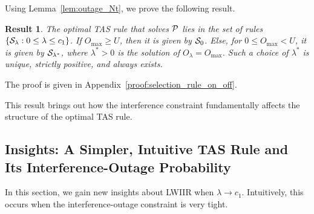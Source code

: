 \documentclass[12pt,draftcls,peerreview,onecolumn]{IEEEtran}
\newtheorem{result}{{\bf Result}}
\newcommand{\brac}[1]{\left({#1}\right)}
\newcommand{\set}[1]{\{#1\}}
\newcommand{\tendsto}{\to}
\newcommand{\ie}{{i.e.}}
\newcommand{\prob}[1]{\text{Pr}\brac{#1}}
\newcommand{\lam}{\lambda}
\newcommand{\lamstar}{\lam^{*}}
\newcommand{\Nt}{{N_t}}
\newcommand{\Pt}{{P_t}}
\newcommand{\puch}{g}
\newcommand{\gk}[1]{{\puch_{#1}}}
\newcommand{\g}{\mathbf{\puch}}
\newcommand{\outmax}{O_{\text{max}}}
\newcommand{\itau}{\tau}
\newcommand{\cone}{c_{1}}
\newcommand{\out}{O}
\newcommand{\taubypt}{\frac{\itau}{\Pt}}
\newcommand{\gkgrtaubypt}[1]{{\gk{#1}}>\taubypt}
\newcommand{\un}{U}
\newcommand{\optproblem}{{\cal P}}
\newcommand{\caluncons}{{\cal S_{\text{0}}}}
\newcommand{\callamrule}{{\cal S_{{\lam}}}}
\newcommand{\outlam}{\out_{\lam}}
\newcommand{\callamstarrule}{\cal S_{\lam^{*}}}
\begin{document}
Using Lemma~\ref{lem:outage_Nt}, we prove the following result. 
%
\begin{result}
\label{res:selection_rule_on_off}
The optimal TAS rule that solves $\optproblem$ lies in the set of rules $\set{\callamrule:0\leq\lam\leq\cone}$. If $\outmax\geq\un$, then it is given by $\caluncons$. Else, for $0\leq\outmax<\un$, it is given by $\callamstarrule$, where $\lamstar>0$  is the solution of $\outlam=\outmax$. Such a choice of $\lamstar$ is unique, strictly positive, and always exists. 
\end{result}
%                
\begin{IEEEproof}
   The proof is given in Appendix~\ref{proof:selection_rule_on_off}.
\end{IEEEproof}
%

This result brings out how the interference constraint fundamentally affects the structure of the optimal TAS rule.


\subsection{Insights: A Simpler, Intuitive  TAS Rule and Its Interference-Outage Probability}
In this section, we gain new insights about LWIIR when $\lam \tendsto \cone$. Intuitively, this occurs when the interference-outage constraint is very tight. %
%
\end{document}
